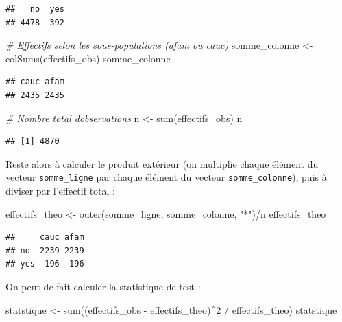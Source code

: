 \documentclass[
  11pt,
]{book}
\newenvironment{Shaded}{\begin{snugshade}}{\end{snugshade}}
\newcommand{\CommentTok}[1]{\textcolor[rgb]{0.56,0.35,0.01}{\textit{#1}}}
\newcommand{\DecValTok}[1]{\textcolor[rgb]{0.00,0.00,0.81}{#1}}
\newcommand{\FunctionTok}[1]{\textcolor[rgb]{0.00,0.00,0.00}{#1}}
\newcommand{\NormalTok}[1]{#1}
\newcommand{\OtherTok}[1]{\textcolor[rgb]{0.56,0.35,0.01}{#1}}
\newcommand{\SpecialCharTok}[1]{\textcolor[rgb]{0.00,0.00,0.00}{#1}}
\newcommand{\StringTok}[1]{\textcolor[rgb]{0.31,0.60,0.02}{#1}}
\numberwithin{equation}{section}
\numberwithin{countremarque}{section}
\begin{document}
\begin{lstlisting}
##   no  yes 
## 4478  392
\end{lstlisting}

\begin{Shaded}
\begin{Highlighting}[]
\CommentTok{\# Effectifs selon les sous{-}populations (afam ou cauc)}
\NormalTok{somme\_colonne }\OtherTok{\textless{}{-}} \FunctionTok{colSums}\NormalTok{(effectifs\_obs)}
\NormalTok{somme\_colonne}
\end{Highlighting}
\end{Shaded}

\begin{lstlisting}
## cauc afam 
## 2435 2435
\end{lstlisting}

\begin{Shaded}
\begin{Highlighting}[]
\CommentTok{\# Nombre total d\textquotesingle{}observations}
\NormalTok{n }\OtherTok{\textless{}{-}} \FunctionTok{sum}\NormalTok{(effectifs\_obs)}
\NormalTok{n}
\end{Highlighting}
\end{Shaded}

\begin{lstlisting}
## [1] 4870
\end{lstlisting}

Reste alors à calculer le produit extérieur (on multiplie chaque élément du vecteur \texttt{somme\_ligne} par chaque élément du vecteur \texttt{somme\_colonne}), puis à diviser par l'effectif total :

\begin{Shaded}
\begin{Highlighting}[]
\NormalTok{effectifs\_theo }\OtherTok{\textless{}{-}} \FunctionTok{outer}\NormalTok{(somme\_ligne, somme\_colonne, }\StringTok{"*"}\NormalTok{)}\SpecialCharTok{/}\NormalTok{n}
\NormalTok{effectifs\_theo}
\end{Highlighting}
\end{Shaded}

\begin{lstlisting}
##     cauc afam
## no  2239 2239
## yes  196  196
\end{lstlisting}

On peut de fait calculer la statistique de test :

\begin{Shaded}
\begin{Highlighting}[]
\NormalTok{statstique }\OtherTok{\textless{}{-}} \FunctionTok{sum}\NormalTok{((effectifs\_obs }\SpecialCharTok{{-}}\NormalTok{ effectifs\_theo)}\SpecialCharTok{\^{}}\DecValTok{2} \SpecialCharTok{/}\NormalTok{ effectifs\_theo)}
\NormalTok{statstique}
\end{Highlighting}
\end{Shaded}
\end{document}
